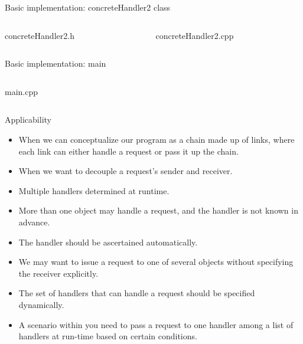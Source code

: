 \documentclass[13pt]{beamer}
\begin{document}
\begin{frame}{Basic implementation: concreteHandler2 class}
\begin{columns}[T]
\begin{column}{.45\textwidth}
\lstset{basicstyle=\tiny,style=myCustomCppStyle}
concreteHandler2.h

\end{column}

\begin{column}{.45\textwidth}
\lstset{basicstyle=\tiny,style=myCustomCppStyle}
concreteHandler2.cpp

\end{column}
\end{columns}
\end{frame}

\begin{frame}{Basic implementation: main}
\begin{columns}[T]
\begin{column}{.45\textwidth}
\lstset{basicstyle=\tiny,style=myCustomCppStyle}
main.cpp

\end{column}

\begin{column}{.45\textwidth}
\end{column}
\end{columns}
\end{frame}

\begin{frame}{Applicability}
	\begin{itemize}
		\item  When we can conceptualize our program as a chain made up of links, where each link can either handle a request or pass it up the chain.
		\item When we want to decouple a request’s sender and receiver.
		\item Multiple handlers determined at runtime.
		\item More than one object may handle a request, and the handler is not known in advance.
		\item The handler should be ascertained automatically.
		\item We may want to issue a request to one of several objects without specifying the receiver explicitly.
		\item The set of handlers that can handle a request should be specified dynamically.
		\item A scenario within you need to pass a request to one handler among a list of handlers at run-time based on certain conditions.
	\end{itemize}
\end{frame}
\end{document}
